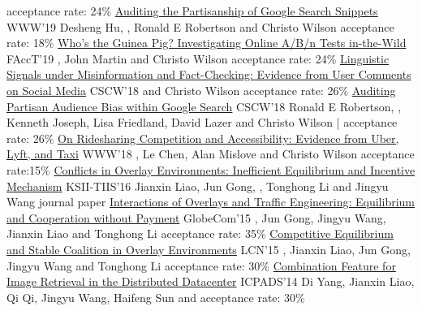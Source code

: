 \documentclass[letterpaper]{awesome-cv}
\begin{document}
\begin{cventries}
    {acceptance rate: 24\%}
  \cvpub
    {\href{https://shanjiang.me/publications/www19_paper.pdf}{Auditing the Partisanship of Google Search Snippets}}
    {WWW'19}
    {Desheng Hu, , Ronald E Robertson and Christo Wilson}
    {acceptance rate: 18\%}
  \cvpub
    {\href{https://shanjiang.me/publications/facct19_paper.pdf}{Who's the Guinea Pig? Investigating Online A/B/n Tests in-the-Wild}}
    {FAccT'19}
    {, John Martin and Christo Wilson}
    {acceptance rate: 24\%}
  \cvpub
    {\href{https://shanjiang.me/publications/cscw18a_paper.pdf}{Linguistic Signals under Misinformation and Fact-Checking: Evidence from User Comments on Social Media}}
    {CSCW'18}
    { and Christo Wilson}
    {acceptance rate: 26\%}
  \cvpub
    {\href{https://shanjiang.me/publications/cscw18b_paper.pdf}{Auditing Partisan Audience Bias within Google Search}}
    {CSCW'18}
    {Ronald E Robertson, , Kenneth Joseph, Lisa Friedland, David Lazer and Christo Wilson}
    { | acceptance rate: 26\%}
  \cvpub
    {\href{https://shanjiang.me/publications/www18_paper.pdf}{On Ridesharing Competition and Accessibility: Evidence from Uber, Lyft, and Taxi}}
    {WWW'18}
    {, Le Chen, Alan Mislove and Christo Wilson}
    {acceptance rate:15\%}
  \cvpub
    {\href{https://shanjiang.me/publications/tiis16_paper.pdf}{Conflicts in Overlay Environments: Inefficient Equilibrium and Incentive Mechanism}}
    {KSII-TIIS'16}
    {Jianxin Liao, Jun Gong, , Tonghong Li and Jingyu Wang}
    {journal paper}
  \cvpub
    {\href{https://shanjiang.me/publications/globecom15_paper.pdf}{Interactions of Overlays and Traffic Engineering: Equilibrium and Cooperation without Payment}}
    {GlobeCom'15}
    {, Jun Gong, Jingyu Wang, Jianxin Liao and Tonghong Li}
    {acceptance rate: 35\%}
  \cvpub
    {\href{https://shanjiang.me/publications/lcn15_paper.pdf}{Competitive Equilibrium and Stable Coalition in Overlay Environments}}
    {LCN'15}
    {, Jianxin Liao, Jun Gong, Jingyu Wang and Tonghong Li}
    {acceptance rate: 30\%}
  \cvpub
    {\href{https://shanjiang.me/publications/icpads14_paper.pdf}{Combination Feature for Image Retrieval in the Distributed Datacenter}}
    {ICPADS'14}
    {Di Yang, Jianxin Liao, Qi Qi, Jingyu Wang, Haifeng Sun and }
    {acceptance rate: 30\%}
\end{cventries}
\end{document}
